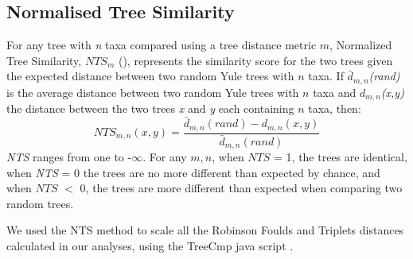 \subsection{Normalised Tree Similarity}
For any tree with \textit{n} taxa compared using a tree distance metric $m$, Normalized Tree Similarity, $NTS_m$ (\citealp{Bogdanowicz2012}), represents the similarity score for the two trees given the expected distance between two random Yule trees with $n$ taxa. If $\bar{d}_{m,n}$\textit{(rand)} is the average distance between two random Yule trees with $n$ taxa and $d_{m,n}$\textit{(x,y)} the distance between the two trees \textit{x} and \textit{y} each containing $n$ taxa, then:
\begin{equation}
NTS_{m,n}(x,y)=\frac{\bar{d}_{m,n}(rand) - d_{m,n}(x,y)} {\bar{d}_{m,n}(rand)}
\end{equation}
\textit{NTS} ranges from one to -$\infty$.
For any $m,n$, when $NTS$ = 1, the trees are identical, when \textit{NTS} = 0 the trees are no more different than expected by chance, and when $NTS$ $<$ 0, the trees are more different than expected when comparing two random trees. 

We used the NTS method to scale all the Robinson Foulds and Triplets distances calculated in our analyses, using the TreeCmp java script \citep{Bogdanowicz2012}.


